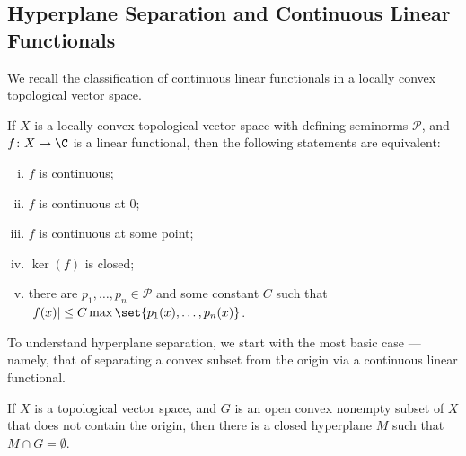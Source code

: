 \documentclass[10pt]{mypackage}
\begin{document}
\subsection{Hyperplane Separation and Continuous Linear Functionals}%
We recall the classification of continuous linear functionals in a locally convex topological vector space.
\begin{theorem}
  If $X$ is a locally convex topological vector space with defining seminorms $ \mathcal{P} $, and $f\colon X\rightarrow \C$ is a linear functional, then the following statements are equivalent:
  \begin{enumerate}[(i)]
    \item $f$ is continuous;
    \item $f$ is continuous at $0$;
    \item $f$ is continuous at some point;
    \item $\ker(f)$ is closed;
    \item there are $p_1,\dots,p_n\in \mathcal{P}$ and some constant $C$ such that $\left\vert f(x) \right\vert\leq C\max\set{p_1(x),\dots,p_n(x)}$.
  \end{enumerate}
\end{theorem}
To understand hyperplane separation, we start with the most basic case --- namely, that of separating a convex subset from the origin via a continuous linear functional.
\begin{theorem}
  If $X$ is a topological vector space, and $G$ is an open convex nonempty subset of $X$ that does not contain the origin, then there is a closed hyperplane $M$ such that $M\cap G = \emptyset$.
\end{theorem}
\end{document}
